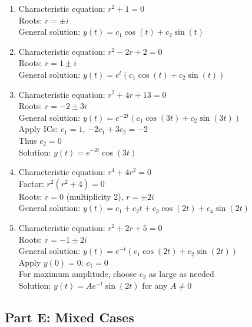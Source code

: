 \documentclass[12pt]{article}
\begin{document}
\begin{enumerate}[resume]
\item Characteristic equation: $r^2 + 1 = 0$\\
Roots: $r = \pm i$\\
General solution: $y(t) = c_1\cos(t) + c_2\sin(t)$

\item Characteristic equation: $r^2 - 2r + 2 = 0$\\
Roots: $r = 1 \pm i$\\
General solution: $y(t) = e^t(c_1\cos(t) + c_2\sin(t))$

\item Characteristic equation: $r^2 + 4r + 13 = 0$\\
Roots: $r = -2 \pm 3i$\\
General solution: $y(t) = e^{-2t}(c_1\cos(3t) + c_2\sin(3t))$\\
Apply ICs: $c_1 = 1$, $-2c_1 + 3c_2 = -2$\\
Thus $c_2 = 0$\\
Solution: $y(t) = e^{-2t}\cos(3t)$

\item Characteristic equation: $r^4 + 4r^2 = 0$\\
Factor: $r^2(r^2 + 4) = 0$\\
Roots: $r = 0$ (multiplicity 2), $r = \pm 2i$\\
General solution: $y(t) = c_1 + c_2t + c_3\cos(2t) + c_4\sin(2t)$

\item Characteristic equation: $r^2 + 2r + 5 = 0$\\
Roots: $r = -1 \pm 2i$\\
General solution: $y(t) = e^{-t}(c_1\cos(2t) + c_2\sin(2t))$\\
Apply $y(0) = 0$: $c_1 = 0$\\
For maximum amplitude, choose $c_2$ as large as needed\\
Solution: $y(t) = Ae^{-t}\sin(2t)$ for any $A \neq 0$
\end{enumerate}

\subsection*{Part E: Mixed Cases}
\end{document}
